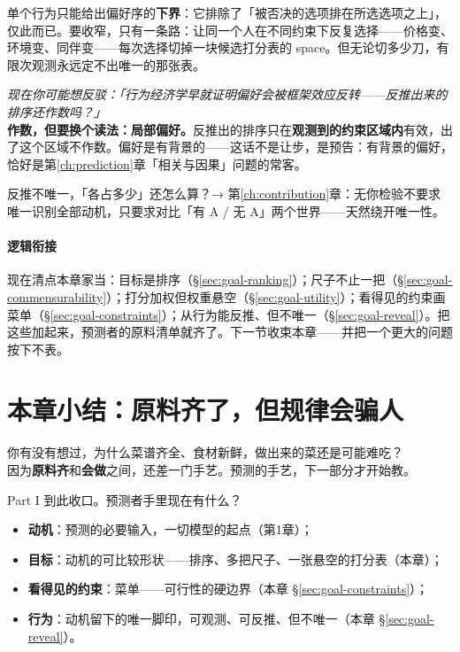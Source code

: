 \documentclass[../../main2.tex]{subfiles}
\begin{document}
	单个行为只能给出偏好序的\textbf{下界}：它排除了「被否决的选项排在所选选项之上」，仅此而已。要收窄，只有一条路：让同一个人在不同约束下反复选择——价格变、环境变、同伴变——每次选择切掉一块候选打分表的 space。但无论切多少刀，有限次观测永远定不出唯一的那张表。

	\begin{questionbox}
		\textit{现在你可能想反驳：「行为经济学早就证明偏好会被框架效应反转——反推出来的排序还作数吗？」}\\
		\textbf{作数，但要换个读法：局部偏好。}反推出的排序只在\textbf{观测到的约束区域内}有效，出了这个区域不作数。偏好是有背景的——这话不是让步，是预告：有背景的偏好，恰好是第\ref{ch:prediction}章「相关与因果」问题的常客。
	\end{questionbox}

	\begin{reader_anticipation}
		\item 反推不唯一，「各占多少」还怎么算？→ 第\ref{ch:contribution}章：无你检验不要求唯一识别全部动机，只要求对比「有 A / 无 A」两个世界——天然绕开唯一性。
	\end{reader_anticipation}

	\paragraph*{逻辑衔接}
	现在清点本章家当：目标是排序（§\ref{sec:goal-ranking}）；尺子不止一把（§\ref{sec:goal-commensurability}）；打分加权但权重悬空（§\ref{sec:goal-utility}）；看得见的约束画菜单（§\ref{sec:goal-constraints}）；从行为能反推、但不唯一（§\ref{sec:goal-reveal}）。把这些加起来，预测者的原料清单就齐了。下一节收束本章——并把一个更大的问题按下不表。

	\section{本章小结：原料齐了，但规律会骗人}
	\label{sec:goal-summary}

	\begin{readingnote}
		你有没有想过，为什么菜谱齐全、食材新鲜，做出来的菜还是可能难吃？\\
		因为\textbf{原料齐}和\textbf{会做}之间，还差一门手艺。预测的手艺，下一部分才开始教。
	\end{readingnote}

	Part I 到此收口。预测者手里现在有什么？
	\begin{itemize}
		\item \textbf{动机}：预测的必要输入，一切模型的起点（第1章）；
		\item \textbf{目标}：动机的可比较形状——排序、多把尺子、一张悬空的打分表（本章）；
		\item \textbf{看得见的约束}：菜单——可行性的硬边界（本章 §\ref{sec:goal-constraints}）；
		\item \textbf{行为}：动机留下的唯一脚印，可观测、可反推、但不唯一（本章 §\ref{sec:goal-reveal}）。
	\end{itemize}
\end{document}
